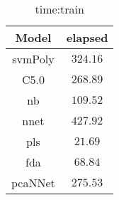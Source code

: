\begin{table}[!ht]
	\centering
	\begin{tabular}{|c|c|}
		\hline
		Model & elapsed \\ \hline
		svmPoly & $324.16$ \\ \hline
		C5.0 & $268.89$ \\ \hline
		nb & $109.52$ \\ \hline
		nnet & $427.92$ \\ \hline
		pls & $21.69$ \\ \hline
		fda & $68.84$ \\ \hline
		pcaNNet & $275.53$ \\ \hline
	\end{tabular}
	\caption{time:train}
	\label{tab:time:train}
\end{table}
